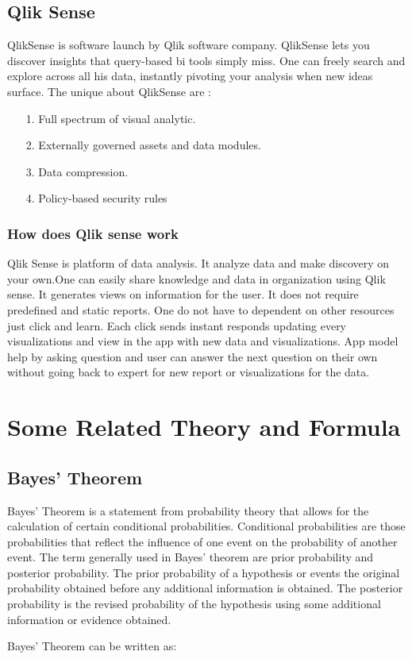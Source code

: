 \section{Qlik Sense}
QlikSense is software launch  by Qlik software company. QlikSense lets you discover insights that query-based \ac{bi} tools simply miss. One can freely search and explore across  all his data, instantly pivoting your analysis when new ideas surface.\cite{troyansky2015qlikview}
\linebreak
The  unique about QlikSense are :

\begin{enumerate}
\item[1.] Full spectrum of visual analytic.
\item[2.] Externally governed assets and data modules.
\item[3.] Data compression.
\item[4.] Policy-based security rules
\end{enumerate}
\par
\subsection{How does Qlik sense work}
Qlik Sense is platform of data analysis. It analyze data and make discovery on your own.One can easily share knowledge and data in organization using Qlik sense. It generates views on information for the user. It does not require predefined and static reports. One do not have to dependent on other resources just click and learn. Each click sends instant responds updating every visualizations and view in the app with new data and visualizations. App model help by asking question and user can answer the next question on their own without going back to expert for new report or visualizations for the data.



\chapter{Some Related Theory and Formula}
\section{Bayes' Theorem}
\par
Bayes’ Theorem is a statement from probability theory that allows for the calculation of  certain conditional  probabilities. Conditional  probabilities  are  those  probabilities  that reflect  the influence  of  one  event  on  the  probability  of  another  event. The  term  generally used in Bayes’ theorem are prior probability and posterior probability. The prior probability of a hypothesis or events the original probability obtained before any additional information is obtained. The posterior probability is the revised probability of the hypothesis using some additional information or evidence obtained.\cite{garg2013design}
\par Bayes’ Theorem can be written as:

